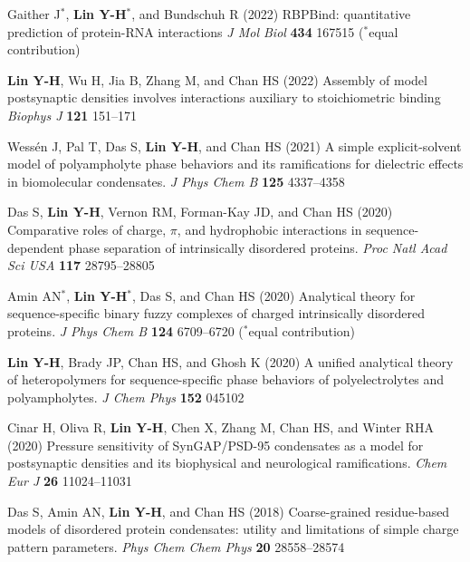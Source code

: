 \documentclass[11pt]{../yhlcv}
\def\tname#1{{\bf #1}}
\begin{document}
\begin{etaremune}[leftmargin=0.26in]

\item
Gaither J$^*$, \tname{Lin Y-H}$^*$, and Bundschuh R (2022)
RBPBind: quantitative prediction of protein-RNA interactions
{\it J Mol Biol} {\bf 434} 167515
($^*$equal contribution)

\item 
\tname{Lin Y-H}, Wu H, Jia B, Zhang M, and Chan HS (2022)
Assembly of model postsynaptic densities involves interactions auxiliary to stoichiometric binding
{\it Biophys J} {\bf 121} 151--171

\item 
Wessén J, Pal T, Das S, \tname{Lin Y-H}, and Chan HS (2021)
A simple explicit-solvent model of polyampholyte phase behaviors and its ramifications for dielectric effects in biomolecular condensates.
{\it J Phys Chem B} {\bf 125} 4337--4358 %

\item 
Das S, \tname{Lin Y-H}, Vernon RM, Forman-Kay JD, and Chan HS (2020)
Comparative roles of charge, $\pi$, and hydrophobic interactions in sequence-dependent phase separation of intrinsically disordered proteins.
{\it Proc Natl Acad Sci USA} {\bf 117} 28795--28805

\item 
Amin AN$^*$, \tname{Lin Y-H}$^*$, Das S, and Chan HS (2020)
Analytical theory for sequence-specific binary fuzzy complexes of charged intrinsically disordered proteins.
{\it J Phys Chem B} 
{\bf 124} 6709--6720
($^*$equal contribution) %

\item
\tname{Lin Y-H}, Brady JP, Chan HS, and Ghosh K (2020)
A unified analytical theory of heteropolymers for sequence-specific phase behaviors of polyelectrolytes and polyampholytes. 
{\it J Chem Phys} {\bf 152} 045102

\item
Cinar H, Oliva R, \tname{Lin Y-H}, Chen X, Zhang M, Chan HS, and Winter RHA (2020)
Pressure sensitivity of SynGAP/PSD-95 condensates as a model for postsynaptic densities and its biophysical and neurological ramifications. 
{\it Chem Eur J} {\bf 26} 11024--11031 %

\item 
Das S, Amin AN, \tname{Lin Y-H}, and Chan HS (2018)
Coarse-grained residue-based models of disordered protein condensates: 
utility and limitations of simple charge pattern parameters.
{\it Phys Chem Chem Phys} {\bf 20} 28558--28574 


\end{etaremune}
\end{document}
